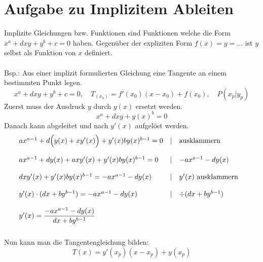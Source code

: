 



\section{Aufgabe zu Implizitem Ableiten}
Implizite Gleichungen bzw. Funktionen sind Funktionen welche die Form $x^a + d x y + y^b + c= 0$ haben.
Gegenüber der expliziten Form $f(x)=y=\ldots$ ist $y$ selbst als Funktion von $x$ definiert.\\\\
Bsp.: Aus einer implizit formulierten Gleichung eine Tangente an einem bestimmten Punkt legen.
\[ x^a + d x y + y^b + c = 0, \quad T_{(x_0)} = f'(x_0)(x-x_0)+f(x_0), \quad P(x_p|y_p) \]
Zuerst muss der Ausdruck $y$ durch $y(x)$ ersetzt werden.
\[ x^a + d x y + y(x)^b = 0\]
Danach kann abgeleitet und nach $y'(x)$ aufgelöst werden.
\[ \begin{array}{lll@{\quad}}
ax^{a-1} + d\Big(y(x) + xy'(x)\Big) + y'(x)by(x)^{b-1} =0 & |& \text{ausklammern} \\\\
ax^{a-1} + dy(x) + axy'(x) + y'(x)by(x)^{b-1} =0          & |& -ax^{a-1} - dy(x) \\\\
dxy'(x) + y'(x) by(x)^{b-1} = -ax^{a-1} - dy(x)           & |& y'(x) \text{ ausklammern } \\\\
y'(x) \cdot (dx + by^{b-1}) = -ax^{a-1} - dy(x)           & |& \div (dx+by^{b-1}) \\\\
y'(x) = \dfrac{-ax^{a-1} - dy(x)}{dx + by^{b-1}}          &  & \\\\
\end{array} \]
Nun kann man die Tangentengleichung bilden:
\[ T(x) = y'(x_p) (x-x_p) + y(x_p) \]
